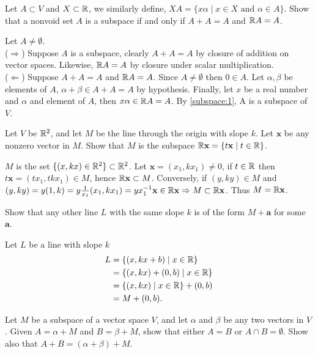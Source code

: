 \documentclass[../../main.tex]{subfiles}
\begin{document}
\begin{problem}
Let $A \subset V$ and $X \subset \mathbb{R}$, we similarly define, $XA = \{x\alpha \mid x \in X \text{ and } \alpha \in A\}$. 
Show that a nonvoid set $A$ is a subspace if and only if $A+A = A$ and $\mathbb{R} A = A$.	
\end{problem}
\begin{solution}
	Let $A \neq \emptyset$. \\
($\Rightarrow$) Suppose $A$ is a subspace, clearly $A+A = A$ by closure of addition on vector spaces. Likewise, $\mathbb{R} A = A$ by closure under scalar multiplication. \\
($ \Leftarrow $) Suppose $A+A=A$ and $\mathbb{R} A = A$. Since $A \neq \emptyset$ then $0 \in A$. Let $\alpha, \beta$ be elements of $A$, $\alpha + \beta \in A+A = A$ by hypothesis. Finally, let $x$ be a real number and $\alpha$ and element of $A$, then $x\alpha \in \mathbb{R} A = A$. By \ref{subspace:1}, A is a subspace of $V$.
\end{solution}
\begin{problem}
Let $V$ be $\mathbb{R}^2$, and let $M$ be the line through the origin with slope $k$. Let $\mathbf{x}$ be any nonzero vector in $M$. Show that $M$ is the subspace $\mathbb{R}\mathbf{x} = \{t\mathbf{x} \mid t \in \mathbb{R}\}$.	
\end{problem}
\begin{solution}
$M$ is the set $\{(x, kx) \in \mathbb{R}^2\} \subset \mathbb{R}^2$. Let $\mathbf{x} = (x_1, kx_1) \neq 0$, if $t \in \mathbb{R}$ then $t\mathbf{x} = (tx_1, tkx_1) \in M$, hence $\mathbb{R}\mathbf{x} \subset M$.
Conversely, if $(y, ky) \in M$ and $(y, ky) = y(1, k) = y\frac{1}{x_1}(x_1, kx_1) = yx_1^{-1}\mathbf{x} \in \mathbb{R}\mathbf{x} \Rightarrow M \subset \mathbb{R}\mathbf{x}$. Thus $M = \mathbb{R}\mathbf{x}$.
\end{solution}
\begin{problem}
Show that any other line $L$ with the same slope $k$ is of the form $M + \mathbf{a}$ for some $\mathbf{a}$.
\end{problem}
\begin{solution}
Let $L$ be a line with slope $k$
\begin{align*}
	L &= \{(x, kx+b) \mid x \in \mathbb{R} \} \\
	  &= \{(x,kx) + (0,b) \mid x \in \mathbb{R} \} \\
	  &= \{(x, kx) \mid x \in \mathbb{R}\} + (0,b) \\
	  &= M + (0,b).
\end{align*}	

\end{solution}
\begin{problem}
	Let $M$ be a subspace of a vector space $V$, and let $\alpha$ and $\beta$ be any two vectors in $V$.
	Given $A = \alpha + M$ and $B = \beta + M$, show that either $A = B$ or $A \cap B = \emptyset$.
	Show also that $A+B=(\alpha + \beta)  + M$.	
\end{problem}
\end{document}

